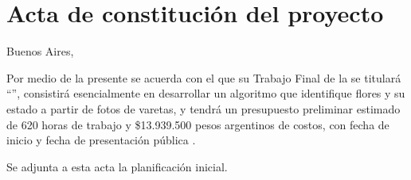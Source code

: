 \documentclass[
11pt, %
codirector, %
]{charter}
\begin{document}
\pagebreak



\section*{Acta de constitución del proyecto}
\label{sec:acta}

\begin{flushright}
Buenos Aires, \fechaInicioName
\end{flushright}

\vspace{2cm}

Por medio de la presente se acuerda con el \authorname\hspace{1px} que su Trabajo Final de la \degreename\hspace{1px} se titulará ``\ttitle'', consistirá esencialmente en desarrollar un algoritmo que identifique flores y su estado a partir de fotos de varetas, y tendrá un presupuesto preliminar estimado de 620 horas de trabajo y \$13.939.500 pesos argentinos de costos, con fecha de inicio \fechaInicioName\hspace{1px} y fecha de presentación pública \fechaFinalName.

Se adjunta a esta acta la planificación inicial.

\vfill
\end{document}
